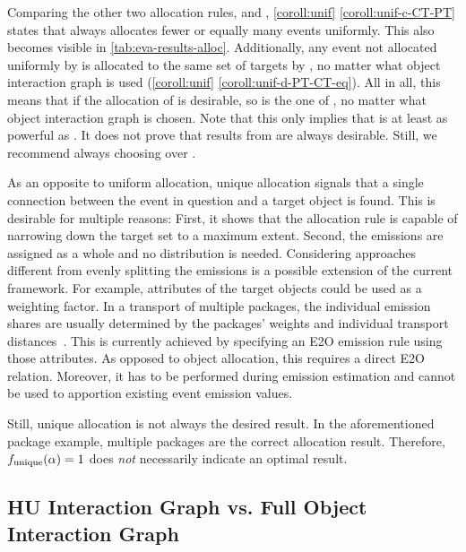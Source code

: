 Comparing the other two allocation rules,  and , \cref{coroll:unif} \ref{coroll:unif-c-CT-PT} states that  always allocates fewer or equally many events uniformly. This also becomes visible in \autoref{tab:eva-results-alloc}.
Additionally, any event not allocated uniformly by  is allocated to the same set of targets by , no matter what object interaction graph is used (\cref{coroll:unif} \ref{coroll:unif-d-PT-CT-eq}).
%
All in all, this means that if the allocation of  is desirable, so is the one of , no matter what object interaction graph is chosen.
Note that this only implies that  is at least as powerful as . It does not prove that results from  are always desirable.
Still, we recommend always choosing  over .

As an opposite to uniform allocation, unique allocation signals that a single connection between the event in question and a target object is found. This is desirable for multiple reasons:
First, it shows that the allocation rule is capable of narrowing down the target set to a maximum extent.
Second, the emissions are assigned as a whole and no distribution is needed.
Considering approaches different from evenly splitting the emissions is a possible extension of the current framework. For example, attributes of the target objects could be used as a weighting factor. In a transport of multiple packages, the individual emission shares are usually determined by the packages' weights and individual transport distances~\cite{Jevinger16consignment}. This is currently achieved by specifying an E2O emission rule using those attributes. As opposed to object allocation, this requires a direct E2O relation. Moreover, it has to be performed during emission estimation and cannot be used to apportion existing event emission values.

Still, unique allocation is not always the desired result. In the aforementioned package example, multiple packages are the correct allocation result. Therefore, $f_{\text{unique}}(\alpha)=1$ does \textit{not} necessarily indicate an optimal result.

\subsection*{HU Interaction Graph vs. Full Object Interaction Graph}

